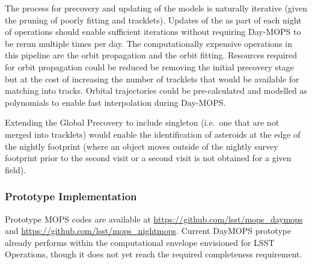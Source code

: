 The process for precovery and updating of the \SSObject models is naturally iterative (given the pruning of poorly fitting \DIAObjects and tracklets). Updates of the \SSObjects as part of each night of operations should enable sufficient iterations without requiring Day-MOPS to be rerun multiple times per day. The computationally expensive operations in this pipeline are the orbit propagation and the orbit fitting. Resources required for orbit propagation could be reduced be removing the initial precovery stage but at the cost of increasing the number of tracklets that would be available for matching into tracks. Orbital trajectories could be pre-calculated and modelled as polynomials to enable fast interpolation during Day-MOPS.



Extending the Global Precovery to include singleton \DIASources (i.e.\ one that are not merged into tracklets) would enable the identification of asteroids at the edge of the nightly footprint (where an object moves outside of the nightly survey footprint prior to the second visit or a second visit is not obtained for a given field).

\subsubsection{Prototype Implementation}

Prototype MOPS codes are available at \url{https://github.com/lsst/mops_daymops} and \url{https://github.com/lsst/mops_nightmops}. Current DayMOPS prototype already performs within the computational envelope envisioned for LSST Operations, though it does not yet reach the required completeness requirement.
